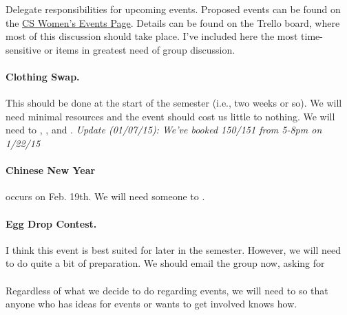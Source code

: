 \documentclass{agenda}
\begin{document}
\begin{agendaitem}{15}{Delegate responsibilities for upcoming events.}
    Proposed events can be found on the \href{http://umasscswomen.weebly.com/events.html}{\underline{CS Women's Events Page}}. Details can be found on the Trello board, where most of this discussion should take place. I've included here the most time-sensitive or items in greatest need of group discussion. 
    
    \paragraph{Clothing Swap.} This should be done at the start of the semester (i.e., two weeks or so). We will need minimal resources and the event should cost us little to nothing. We will need to , , and . \emph{Update (01/07/15): We've booked 150/151 from 5-8pm on 1/22/15}
    
    \paragraph{Chinese New Year} occurs on Feb. 19th. We will need someone to . 
     
    \paragraph{Egg Drop Contest.} I think this event is best suited for later in the semester. However, we will need to do quite a bit of preparation. We should email the group now, asking for 
\\\\    
       Regardless of what we decide to do regarding events, we will need to  so that anyone who has ideas for events or wants to get involved knows how. 
\end{agendaitem}
\end{document}

